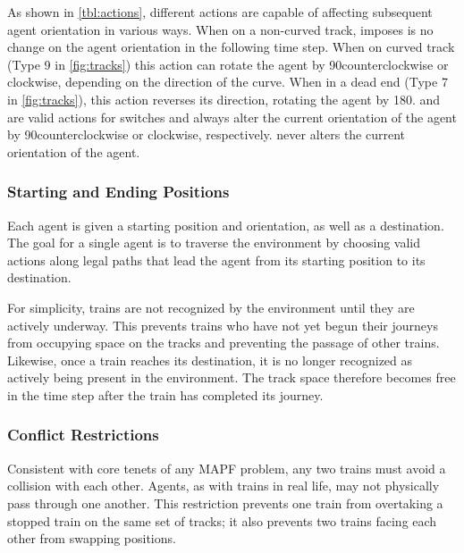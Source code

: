 \documentclass[11pt]{article}
\begin{document}
\endgroup


As shown in \autoref{tbl:actions}, different actions are capable of affecting subsequent agent orientation in various ways.  When on a non-curved track,  imposes is no change on the agent orientation in the following time step.  When on curved track (Type 9 in \autoref{fig:tracks}) this action can rotate the agent by 90\degree counterclockwise or clockwise, depending on the direction of the curve.   When in a dead end (Type 7 in \autoref{fig:tracks}), this action reverses its direction, rotating the agent by 180\degree .   and  are valid actions for switches and always alter the current orientation of the agent by 90\degree counterclockwise or clockwise, respectively.   never alters the current orientation of the agent.

\subsubsection{Starting and Ending Positions}
\label{sec:Positions}
Each agent is given a starting position and orientation, as well as a destination.  The goal for a single agent is to traverse the environment by choosing valid actions along legal paths that lead the agent from its starting position to its destination.  

For simplicity, trains are not recognized by the environment until they are actively underway.  This prevents trains who have not yet begun their journeys from occupying space on the tracks and preventing the passage of other trains.  Likewise, once a train reaches its destination, it is no longer recognized as actively being present in the environment.  The track space therefore becomes free in the time step after the train has completed its journey.

\subsubsection{Conflict Restrictions}
\label{sec:Conflicts}
Consistent with core tenets of any MAPF problem, any two trains must avoid a collision with each other.  Agents, as with trains in real life, may not physically pass through one another.  This restriction prevents one train from overtaking a stopped train on the same set of tracks; it also prevents two trains facing each other from swapping positions.
\end{document}
